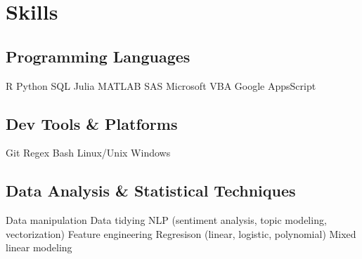 \documentclass[letterpaper]{deedy-resume_sm} %
\begin{document}

\section{Skills}
\subsection{Programming Languages}
R \textbullet{} Python \textbullet{} SQL \textbullet{} Julia \textbullet{} MATLAB \textbullet{} SAS \textbullet{} Microsoft VBA \textbullet{} Google AppsScript
\subsection{Dev Tools \& Platforms}
Git \textbullet{} Regex \textbullet{} Bash \textbullet{} Linux/Unix \textbullet{} Windows
\subsection{Data Analysis \& Statistical Techniques}
Data manipulation \textbullet{} Data tidying \textbullet{} NLP (sentiment analysis, topic modeling, vectorization) \textbullet{} Feature engineering \textbullet{} Regresison (linear, logistic, polynomial) \textbullet{} Mixed linear modeling \textbullet{} %
\end{document}
